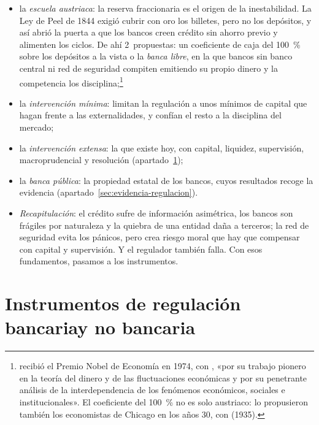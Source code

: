 \documentclass[11pt]{article}
\begin{document}
\begin{itemize}
\begin{itemize}
  \item la \emph{escuela austriaca}: la reserva fraccionaria es el origen de la inestabilidad. La Ley de Peel de 1844 exigió cubrir con oro los billetes, pero no los depósitos, y así abrió la puerta a que los bancos creen crédito sin ahorro previo y alimenten los ciclos. De ahí 2~propuestas: un coeficiente de caja del 100~\% sobre los depósitos a la vista\nocite{HuertaDeSoto1998Dinero} o la \emph{banca libre}, en la que bancos sin banco central ni red de seguridad compiten emitiendo su propio dinero y la competencia los disciplina\nocite{Hayek1976Denationalisation};\footnote{ recibió el Premio Nobel de Economía en 1974, con , «por su trabajo pionero en la teoría del dinero y de las fluctuaciones económicas y por su penetrante análisis de la interdependencia de los fenómenos económicos, sociales e institucionales»\nocite{Nobel1974}. El coeficiente del 100~\% no es solo austriaco: lo propusieron también los economistas de Chicago en los años 30, con  (1935)\nocite{Fisher1935Money}.}
  \item la \emph{intervención mínima}: \textcite{BenstonKaufman1996} limitan la regulación a unos mínimos de capital que hagan frente a las externalidades, y confían el resto a la disciplina del mercado;
  \item la \emph{intervención extensa}: la que existe hoy, con capital, liquidez, supervisión, macroprudencial y resolución (apartado~\ref{sec:instrumentos});
  \item la \emph{banca pública}: la propiedad estatal de los bancos, cuyos resultados recoge la evidencia (apartado~\ref{sec:evidencia-regulacion}).
  \end{itemize}
\end{itemize}

\begin{itemize}
\item \emph{Recapitulación}: el crédito sufre de información asimétrica, los bancos son frágiles por naturaleza y la quiebra de una entidad daña a terceros; la red de seguridad evita los pánicos, pero crea riesgo moral que hay que compensar con capital y supervisión. Y el regulador también falla. Con esos fundamentos, pasamos a los instrumentos.
\end{itemize}

\section{Instrumentos de regulación bancaria\cortetitulo y no bancaria}\label{sec:instrumentos}
\end{document}
